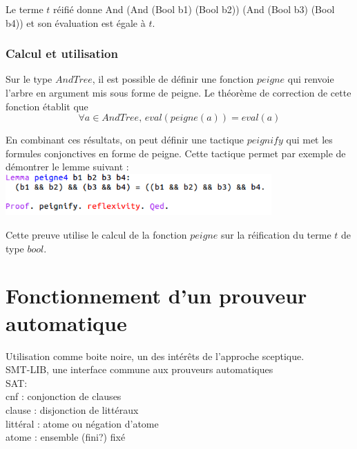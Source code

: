 \documentclass{article}
\begin{document}
Le terme $t$ réifié donne And (And (Bool b1) (Bool b2)) (And (Bool b3) (Bool b4)) et son évaluation est égale à $t$.

\subsubsection{Calcul et utilisation}

Sur le type $AndTree$, il est possible de définir une fonction $peigne$ qui renvoie l'arbre en argument mis sous forme de peigne. Le théorème de correction de cette fonction établit que 
\[ \forall a \in AndTree, \, eval (peigne (a)) = eval (a) \]

En combinant ces résultats, on peut définir une tactique $peignify$ qui met les formules conjonctives en forme de peigne. Cette tactique permet par exemple de démontrer le lemme suivant : \\

\includegraphics[height = 1.6cm]{peignify.png}

Cette preuve utilise le calcul de la fonction $peigne$ sur la réification du terme $t$ de type $bool$.







\newpage
\section{Fonctionnement d'un prouveur automatique}

Utilisation comme boite noire, un des intérêts de l'approche sceptique.\\


SMT-LIB, une interface commune aux prouveurs automatiques\\

SAT: \\
cnf : conjonction de clauses \\ 
clause : disjonction de littéraux \\
littéral : atome ou négation d'atome \\
atome : ensemble (fini?) fixé \\
\end{document}
